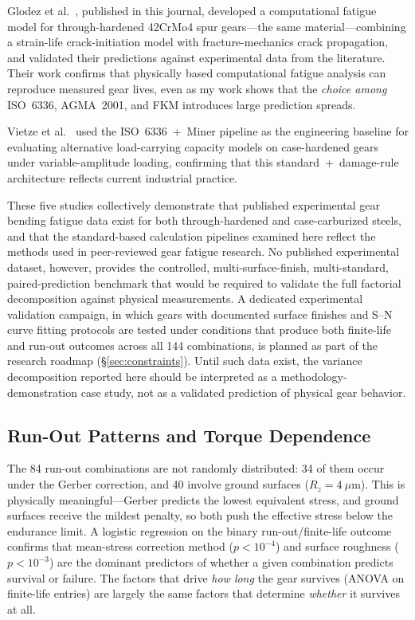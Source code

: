 \documentclass[twocolumn,12pt,a4paper]{article}
\begin{document}
Glodez et al.~\cite{glodez2002}, published in this journal, developed a
computational fatigue model for through-hardened 42CrMo4 spur
gears---the same material---combining a strain-life crack-initiation
model with fracture-mechanics crack propagation, and validated their
predictions against experimental data from the literature. Their work
confirms that physically based computational fatigue analysis can
reproduce measured gear lives, even as my work shows that the
\emph{choice among} ISO~6336, AGMA~2001, and FKM introduces large
prediction spreads.

Vietze et al.~\cite{vietze2024} used the ISO~6336~+~Miner pipeline as
the engineering baseline for evaluating alternative load-carrying
capacity models on case-hardened gears under variable-amplitude
loading, confirming that this standard~+~damage-rule architecture
reflects current industrial practice.

These five studies collectively demonstrate that published experimental
gear bending fatigue data exist for both through-hardened and
case-carburized steels, and that the standard-based calculation
pipelines examined here reflect the methods used in peer-reviewed gear
fatigue research. No published experimental dataset, however, provides
the controlled, multi-surface-finish, multi-standard, paired-prediction
benchmark that would be required to validate the full factorial
decomposition against physical measurements. A dedicated experimental
validation campaign, in which gears with documented surface finishes
and S--N curve fitting protocols are tested under conditions that
produce both finite-life and run-out outcomes across all 144
combinations, is planned as part of the research roadmap
(\S\ref{sec:constraints}). Until such data exist, the variance
decomposition reported here should be interpreted as a
methodology-demonstration case study, not as a validated prediction of
physical gear behavior.

\subsection{Run-Out Patterns and Torque Dependence}

The 84 run-out combinations are not randomly distributed: 34 of them
occur under the Gerber correction, and 40 involve ground surfaces
($R_z = 4~\mu$m). This is physically meaningful---Gerber predicts the
lowest equivalent stress, and ground surfaces receive the mildest
penalty, so both push the effective stress below the endurance limit.
A logistic regression on the binary run-out/finite-life outcome
confirms that mean-stress correction method ($p < 10^{-4}$) and
surface roughness ($p < 10^{-3}$) are the dominant predictors of
whether a given combination predicts survival or failure. The factors
that drive \emph{how long} the gear survives (ANOVA on finite-life
entries) are largely the same factors that determine \emph{whether} it
survives at all.
\end{document}
